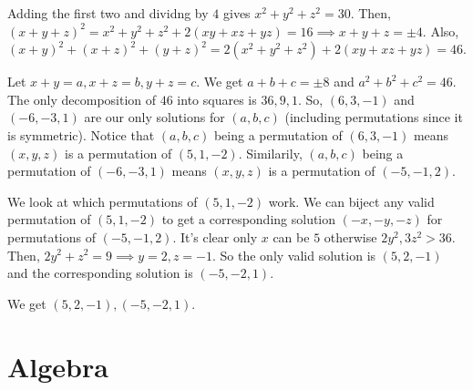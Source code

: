 \documentclass[11pt]{article}
\begin{document}
\begin{sol} 
Adding the first two and dividng by $4$ gives $x^2+y^2+z^2=30$. Then, $(x+y+z)^2=x^2+y^2+z^2+2(xy+xz+yz)=16\implies x+y+z=\pm 4$. Also, $(x+y)^2+(x+z)^2+(y+z)^2=2(x^2+y^2+z^2)+2(xy+xz+yz)=46$. 

Let $x+y=a, x+z=b, y+z=c$. We get $a+b+c=\pm 8$ and $a^2+b^2+c^2=46$. The only decomposition of $46$ into squares is $36,9,1$. So, $(6,3,-1)$ and $(-6,-3,1)$ are our only solutions for $(a,b,c)$ (including permutations since it is symmetric). Notice that $(a,b,c)$ being a permutation of $(6,3,-1)$ means $(x,y,z)$ is a permutation of $(5,1,-2)$. Similarily, $(a,b,c)$ being a permutation of $(-6,-3,1)$ means $(x,y,z)$ is a permutation of $(-5,-1,2)$.

We look at which permutations of $(5,1,-2)$ work. We can biject any valid permutation of $(5,1,-2)$ to get a corresponding solution $(-x,-y,-z)$ for permutations of $(-5,-1,2)$. It's clear only $x$ can be $5$ otherwise $2y^2,3z^2>36$. Then, $2y^2+z^2=9\implies y=2,z=-1$. So the only valid solution is $(5,2,-1)$ and the corresponding solution is $(-5,-2,1)$.

We get $\boxed{(5,2,-1),(-5,-2,1)}$.
\end{sol}





\setcounter{problem}{0}
\section{Algebra}
\end{document}
